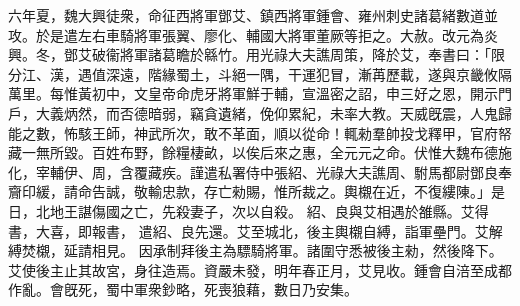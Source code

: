 \begin{pinyinscope}
 
六年夏，魏大興徒衆，命征西將軍鄧艾、鎮西將軍鍾會、雍州刺史諸葛緒數道並攻。於是遣左右車騎將軍張翼、廖化、輔國大將軍董厥等拒之。大赦。改元為炎興。冬，鄧艾破衞將軍諸葛瞻於緜竹。用光祿大夫譙周策，降於艾，奉書曰：「限分江、漢，遇值深遠，階緣蜀土，斗絕一隅，干運犯冒，漸苒歷載，遂與京畿攸隔萬里。每惟黃初中，文皇帝命虎牙將軍鮮于輔，宣溫密之詔，申三好之恩，開示門戶，大義炳然，而否德暗弱，竊貪遺緒，俛仰累紀，未率大教。天威旣震，人鬼歸能之數，怖駭王師，神武所次，敢不革面，順以從命！輒勑羣帥投戈釋甲，官府帑藏一無所毀。百姓布野，餘糧棲畝，以俟后來之惠，全元元之命。伏惟大魏布德施化，宰輔伊、周，含覆藏疾。謹遣私署侍中張紹、光祿大夫譙周、駙馬都尉鄧良奉齎印緩，請命告誠，敬輸忠款，存亡勑賜，惟所裁之。輿櫬在近，不復縷陳。」是日，北地王諶傷國之亡，先殺妻子，次以自殺。
 紹、良與艾相遇於雒縣。艾得書，大喜，即報書，
 遣紹、良先還。艾至城北，後主輿櫬自縛，詣軍壘門。艾解縛焚櫬，延請相見。
 因承制拜後主為驃騎將軍。諸圍守悉被後主勑，然後降下。艾使後主止其故宮，身往造焉。資嚴未發，明年春正月，艾見收。鍾會自涪至成都作亂。會旣死，蜀中軍衆鈔略，死喪狼藉，數日乃安集。
 

\end{pinyinscope}
